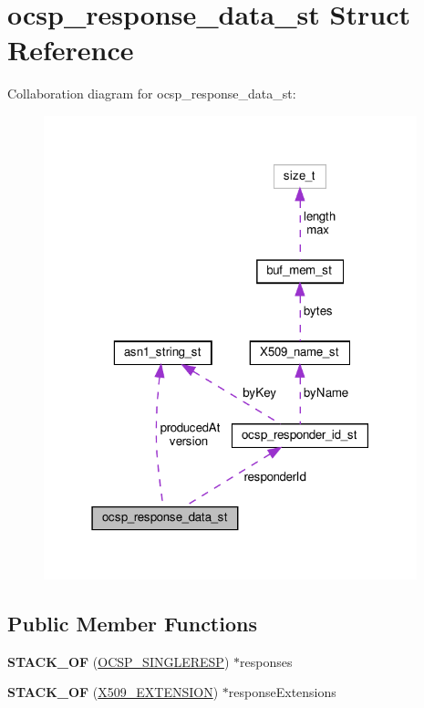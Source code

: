 \hypertarget{structocsp__response__data__st}{}\section{ocsp\+\_\+response\+\_\+data\+\_\+st Struct Reference}
\label{structocsp__response__data__st}


Collaboration diagram for ocsp\+\_\+response\+\_\+data\+\_\+st\+:
\nopagebreak
\begin{figure}[H]
\begin{center}
\leavevmode
\includegraphics[width=307pt]{structocsp__response__data__st__coll__graph}
\end{center}
\end{figure}
\subsection*{Public Member Functions}
\begin{DoxyCompactItemize}
\item 
\mbox{\label{structocsp__response__data__st_a56d73019256af5660a2e0f539f9a9daf}} 
{\bfseries S\+T\+A\+C\+K\+\_\+\+OF} (\hyperlink{structocsp__single__response__st}{O\+C\+S\+P\+\_\+\+S\+I\+N\+G\+L\+E\+R\+E\+SP}) $\ast$responses
\item 
\mbox{\label{structocsp__response__data__st_a84a88c2a6975ca68c843b886f0a96ded}} 
{\bfseries S\+T\+A\+C\+K\+\_\+\+OF} (\hyperlink{structX509__extension__st}{X509\+\_\+\+E\+X\+T\+E\+N\+S\+I\+ON}) $\ast$response\+Extensions
\end{DoxyCompactItemize}
